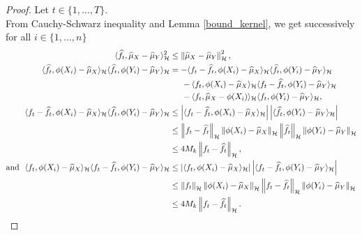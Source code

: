 \documentclass[twoside,11pt]{article}
\newcommand{\Hk}{\mathcal{H}}
\newcommand{\nb}{n}
\begin{document}
\begin{proof}
Let $t \in \{1,\ldots,T\}$. \\
From Cauchy-Schwarz inequality and Lemma \ref{bound_kernel}, we get successively for all $i \in \{1,\ldots,\nb\}$ 
\begin{align*}
    \langle \widehat{f}_t, \widehat{\mu}_X - \widehat{\mu}_Y \rangle_{\Hk}^2 &\leq \left \|  \widehat{\mu}_X - \widehat{\mu}_Y \right \|_{\Hk}^2, \\
    \langle \widehat{f}_t, \phi(X_i) - \widehat{\mu}_X  \rangle_{\Hk} \langle \widehat{f}_t,\phi(Y_i) - \widehat{\mu}_Y  \rangle_{\Hk} &= - \langle f_t - \widehat{f}_t, \phi(X_i) - \widehat{\mu}_X  \rangle_{\Hk} \langle \widehat{f}_t,\phi(Y_i) - \widehat{\mu}_Y  \rangle_{\Hk} \\
    & \hspace{0.5 cm} - \langle f_t, \phi(X_i) - \widehat{\mu}_X  \rangle_{\Hk} \langle f_t - \widehat{f}_t,\phi(Y_i) - \widehat{\mu}_Y  \rangle_{\Hk} \\
    & \hspace{0.5 cm} - \langle f_t, \widehat{\mu}_X - \phi(X_i) \rangle_{\Hk} \langle f_t,\phi(Y_i) - \widehat{\mu}_Y  \rangle_{\Hk}, \\
    \langle f_t - \widehat{f}_t, \phi(X_i) - \widehat{\mu}_X  \rangle_{\Hk} \langle \widehat{f}_t,\phi(Y_i) - \widehat{\mu}_Y  \rangle_{\Hk} &\leq  \left | \langle f_t - \widehat{f}_t, \phi(X_i) - \widehat{\mu}_X  \rangle_{\Hk}  \right | \left | \langle \widehat{f}_t,\phi(Y_i) - \widehat{\mu}_Y  \rangle_{\Hk} \right | \\
    & \leq \left \|  f_t - \widehat{f}_t \right \|_{\Hk} \left \|   \phi(X_i) - \widehat{\mu}_X \right \|_{\Hk} \left \|  \widehat{f}_t \right \|_{\Hk} \left \|  \phi(Y_i) - \widehat{\mu}_Y \right \|_{\Hk} \\
    & \leq 4  M_k \left \|  f_t - \widehat{f}_t \right \|_{\Hk}, \\
    \text{and} \ \ \langle f_t, \phi(X_i) - \widehat{\mu}_X  \rangle_{\Hk} \langle f_t - \widehat{f}_t,\phi(Y_i) - \widehat{\mu}_Y  \rangle_{\Hk} &\leq  \left | \langle f_t, \phi(X_i) - \widehat{\mu}_X  \rangle_{\Hk} \right | \left | \langle f_t - \widehat{f}_t,\phi(Y_i) - \widehat{\mu}_Y \rangle_{\Hk} \right | \\
    & \leq \left \|  f_t \right \|_{\Hk} \left \|   \phi(X_i) - \widehat{\mu}_X \right \|_{\Hk} \left \|  f_t - \widehat{f}_t \right \|_{\Hk} \left \|  \phi(Y_i) - \widehat{\mu}_Y \right \|_{\Hk}  \\
    & \leq 4  M_k \left \|  f_t - \widehat{f}_t \right \|_{\Hk}.

\end{align*}
\end{proof}
\end{document}
